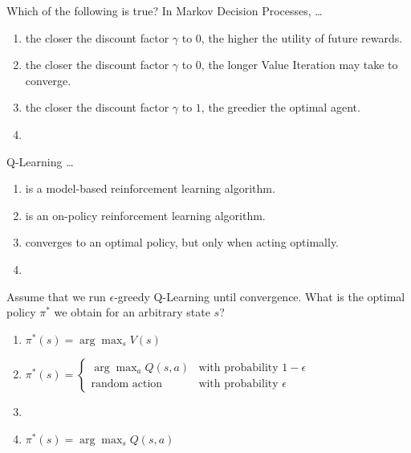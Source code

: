 \documentclass[11pt, a4paper]{exam}
\begin{document}
\begin{quiz}
    \item Which of the following is true? In Markov Decision Processes, \ldots
    \begin{enumerate}[label=$\bigcirc$]
        \item the closer the discount factor $\gamma$ to $0$, the higher the utility of future rewards.
        \item the closer the discount factor $\gamma$ to $0$, the longer Value Iteration may take to converge.
        \item the closer the discount factor $\gamma$ to $1$, the greedier the optimal agent.
        \item {}
    \end{enumerate}

    \item Q-Learning \ldots
    \begin{enumerate}[label=$\bigcirc$]
        \item is a model-based reinforcement learning algorithm.
        \item is an on-policy reinforcement learning algorithm.
        \item converges to an optimal policy, but only when acting optimally.
        \item {}
    \end{enumerate}

    \item Assume that we run $\epsilon$-greedy Q-Learning until convergence. What is the optimal policy $\pi^*$ we obtain for an arbitrary state $s$?
    \begin{enumerate}[label=$\bigcirc$]
        \item $\pi^*(s) = \arg\max_s V(s)$
        \item $\pi^*(s) = \begin{cases}
            \arg\max_a Q(s,a) & \text{with probability $1-\epsilon$} \\
            \text{random action} & \text{with probability $\epsilon$}
        \end{cases}$
        \item {}
        \item $\pi^*(s) = \arg\max_s Q(s,a)$
    \end{enumerate}


\end{quiz}
\end{document}

